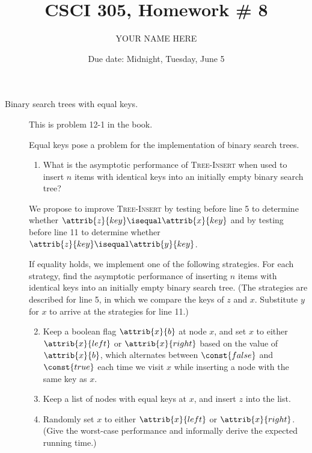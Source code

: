 \documentclass{article}
\title{CSCI 305, Homework \# 8}
\author{YOUR NAME HERE}
\date{Due date:  Midnight, Tuesday, June 5}
\begin{document}
\maketitle

\begin{description}
\item[Binary search trees with equal keys.]  This is problem 12-1
  in the book.

  Equal keys pose a problem for the implementation of binary
  search trees.
  \begin{enumerate}
  \item What is the asymptotic performance of \textsc{Tree-Insert} when
    used to insert $n$ items with identical keys into an initially empty
    binary search tree?
  \end{enumerate}
  We propose to improve \textsc{Tree-Insert} by testing before line 5
  to determine whether $\attrib{z}{key} \isequal\attrib{x}{key}$ 
  and by testing before line 11 to determine whether
  $\attrib{z}{key} \isequal\attrib{y}{key}$.

  If equality holds, we
  implement one of the following strategies.  For each strategy, find
  the asymptotic performance of inserting $n$ items with identical
  keys into an initially empty binary search tree.  (The strategies
  are described for line 5, in which we compare the keys of $z$ and
  $x$.  Substitute $y$ for $x$ to arrive at the strategies for line
  11.) 
  \begin{enumerate}\setcounter{enumi}{1}
  \item Keep a boolean flag $\attrib{x}{b}$ at node $x$, and set $x$
    to either $\attrib{x}{left}$ or $\attrib{x}{right}$ based on the
    value of $\attrib{x}{b}$, which alternates between $\const{false}$
    and $\const{true}$ each time we visit $x$ while inserting a node
    with the same key as $x$. 
\item Keep a list of nodes with equal keys at $x$, and insert $z$ into
  the list.
  \item Randomly set $x$ to either $\attrib{x}{left}$ or
    $\attrib{x}{right}$.  (Give the worst-case performance and
    informally derive the expected running time.)
  \end{enumerate}
  

\end{description}
\end{document}
